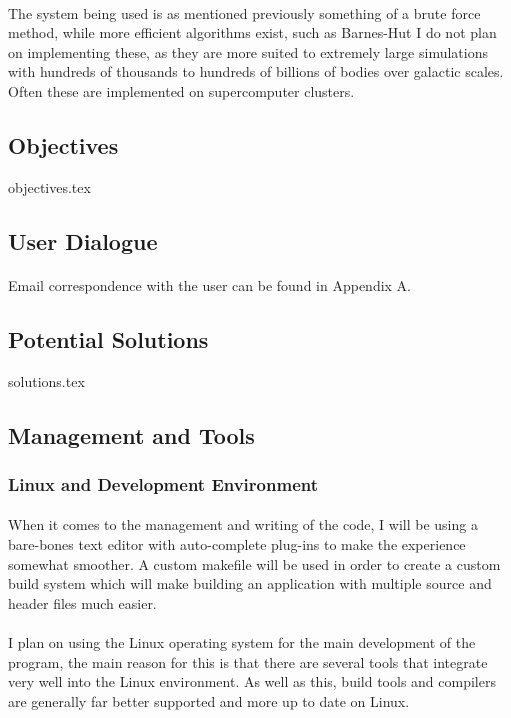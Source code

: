 \paragraph{}
The system being used is as mentioned previously something of a brute force method, while more efficient algorithms exist, such as Barnes-Hut I do not plan on implementing these, as they are more suited to extremely large simulations with hundreds of thousands to hundreds of billions of bodies over galactic scales. Often these are implemented on supercomputer clusters.

\subsection{Objectives}
{objectives.tex}

\subsection{User Dialogue}
\paragraph{}
Email correspondence with the user can be found in Appendix A.

\pagebreak
\subsection{Potential Solutions}
{solutions.tex}

\pagebreak
\subsection{Management and Tools}
\subsubsection{Linux and Development Environment}
\paragraph{}
When it comes to the management and writing of the code, I will be using a bare-bones text editor with auto-complete plug-ins to make the experience somewhat smoother. A custom makefile will be used in order to create a custom build system which will make building an application with multiple source and header files much easier.

\paragraph{}
I plan on using the Linux operating system for the main development of the program, the main reason for this is that there are several tools that integrate very well into the Linux environment. As well as this, build tools and compilers are generally far better supported and more up to date on Linux.

